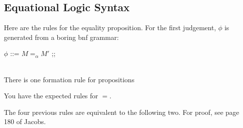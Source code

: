 \documentclass{article}
\begin{document}
\subsection{Equational Logic Syntax}
Here are the rules for the equality proposition.
For the first judgement, $\phi$ is generated from a boring bnf grammar:

\begin{bnf}
    $\phi$ ::= $ M =_{\alpha} M'$ ;;
\end{bnf}
\\
There is one formation rule for propositions
\begin{prooftree}
\end{prooftree}

You have the expected rules for $=$.
\begin{prooftree}
\end{prooftree}

\begin{prooftree}
\end{prooftree}

\begin{prooftree}
\end{prooftree}

\begin{prooftree}
\end{prooftree}

The four previous rules are equivalent to the following two. For proof, see page 180 of Jacobs.

\begin{prooftree}
\end{prooftree}
\end{document}
